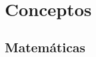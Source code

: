 \documentclass{beamer}
\begin{document}
\section{Conceptos}


%
%
%
%


\subsection{Matem\'aticas}
\end{document}
